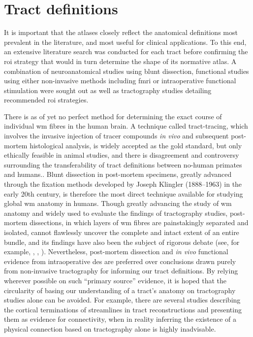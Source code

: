 \documentclass[12pt,phd,a4paper,twoside]{ucl_thesis}
\renewcommand{\textcite}[2][]{
\ifthenelse { \equal {#1} {} }  {\citeauthor{#2}\autocite{#2}}   {\citeauthor{#1}\autocite{#2}}}
\begin{document}
\section{Tract definitions}

It is important that the atlases closely reflect the anatomical definitions most prevalent in the literature, and most useful for clinical applications.
To this end, an extensive literature search was conducted for each tract before confirming the \gls{roi} strategy that would in turn determine the shape of its normative atlas.
A combination of neuroanatomical studies using blunt dissection, functional studies using either non-invasive methods including \gls{fmri} or intraoperative functional stimulation were sought out as well as tractography studies detailing recommended \gls{roi} strategies.

There is as of yet no perfect method for determining the exact course of individual \gls{wm} fibres in the human brain.
A technique called tract-tracing, which involves the invasive injection of tracer compounds \textit{in vivo} and subsequent post-mortem histological analysis, is widely accepted as the gold standard, but only ethically feasible in animal studies, and there is disagreement and controversy surrounding the transferability of tract definitions between no-human primates and humans.\autocite{Becker2022,ThiebautdeSchotten2012}.
Blunt dissection in post-mortem specimens, greatly advanced through the fixation methods developed by Joseph Klingler (1888--1963) in the early 20th century\autocite{Agrawal2011}, is therefore the most direct technique available for studying global \gls{wm} anatomy in humans.
Though greatly advancing the study of \gls{wm} anatomy and widely used to evaluate the findings of tractography studies, post-mortem dissections, in which layers of \gls{wm} fibres are painstakingly separated and isolated, cannot flawlessly uncover the complete and intact extent of an entire bundle\autocite{Martino2010, Dick2012}, and its findings have also been the subject of rigorous debate (see, for example, \textcite{Giampiccolo2022a},\textcite{Becker2022},\textcite{Giampiccolo2022b}).
Nevertheless, post-mortem dissection and \textit{in vivo} functional evidence from intraoperative \gls{des} are preferred over conclusions drawn purely from non-invasive tractography for informing our tract definitions.
By relying wherever possible on such ``primary source'' evidence, it is hoped that the circularity of basing our understanding of a tract's anatomy on tractography studies alone can be avoided. For example, there are several studies describing the cortical terminations of streamlines in tract reconstructions and presenting them as evidence for connectivity\autocite{Conner2018,Hau2016}, when in reality inferring the existence of a physical connection based on tractography alone is highly inadvisable\autocite{Rheault2020}.
\end{document}

